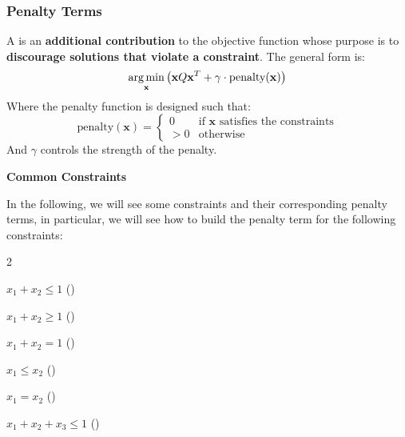 \subsubsection{Penalty Terms}\label{sec:penalty-terms}

A  is an \textbf{additional contribution} to the objective function whose purpose is to \textbf{discourage solutions that violate a constraint}. The general form is:
\begin{equation}\label{eq:qubo-with-penalty}
    \operatorname*{arg\,min}_{\mathbf{x}} \left( \mathbf{x}Q\mathbf{x}^{T} + \gamma \cdot \text{penalty}(\mathbf{x}) \right)
\end{equation}
Where the penalty function is designed such that:
\begin{equation}
    \text{penalty}(\mathbf{x}) = \begin{cases}
        0   & \text{if } \mathbf{x} \text{ satisfies the constraints} \\
        > 0 & \text{otherwise}
    \end{cases}
\end{equation}
And $\gamma$ controls the strength of the penalty.

\highspace
\begin{flushleft}
    \textcolor{Green3}{ \textbf{Common Constraints}}
\end{flushleft}
In the following, we will see some constraints and their corresponding penalty terms, in particular, we will see how to build the penalty term for the following constraints:
\begin{itemize}
    \begin{multicols}{2}
        \item $x_{1} + x_{2} \le 1$ ()
        \item $x_{1} + x_{2} \ge 1$ ()
        \item $x_{1} + x_{2} = 1$ ()
        \item $x_{1} \le x_{2}$ ()
        \item $x_{1} = x_{2}$ ()
        \item $x_{1} + x_{2} + x_{3} \le 1$ ()
    \end{multicols}
\end{itemize}

